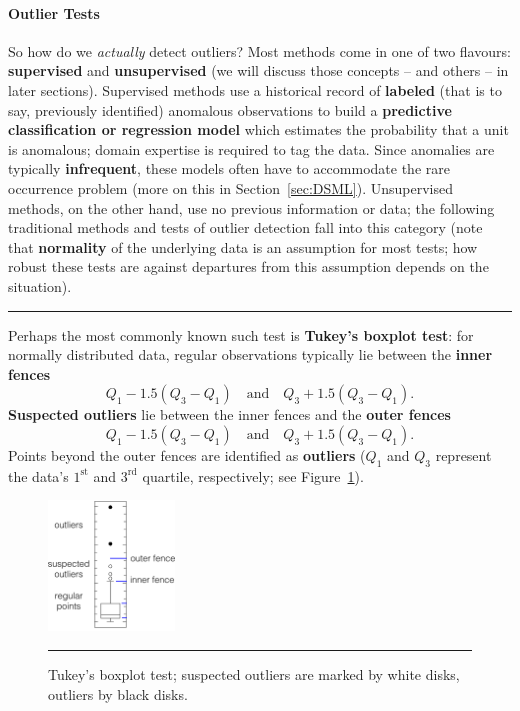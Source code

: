 \paragraph{Outlier Tests} So how do we \textit{actually} detect outliers? Most methods come in one of two flavours: \textbf{supervised} and \textbf{unsupervised} (we will discuss those concepts -- and others -- in later sections).\newl 
Supervised methods use a historical record of \textbf{labeled} (that is to say, previously identified) anomalous observations to build a \textbf{predictive classification or regression model} which estimates the probability that a unit is anomalous; domain expertise is required to tag the data. Since anomalies are typically \textbf{infrequent}, these models often have to accommodate the rare occurrence problem (more on this in Section~\ref{sec:DSML}). Unsupervised methods, on the other hand, use no previous information or data; the following traditional methods and tests of outlier detection fall into this category (note that \textbf{normality} of the underlying data is an assumption for most tests; how robust these tests are against departures from this assumption depends on the situation).
\begin{center}
    \rule{0.5\textwidth}{.4pt}
\end{center}
Perhaps the most commonly known such test is \textbf{Tukey's boxplot test}: for normally distributed data, regular observations typically lie between the \textbf{inner fences} $$Q_1-1.5(Q_3-Q_1) \quad\mbox{and}\quad Q_3+1.5(Q_3-Q_1).$$ \textbf{Suspected outliers} lie between the inner fences and the \textbf{outer fences} 
$$Q_1-1.5(Q_3-Q_1) \quad\mbox{and}\quad Q_3+1.5(Q_3-Q_1).$$
Points beyond the outer fences are identified as \textbf{outliers} ($Q_1$ and $Q_3$ represent the data's   $1^{\textrm{st}}$ and $3^{\textrm{rd}}$ quartile, respectively; see Figure~\ref{fig:boxplot}).
\begin{figure}[t]
\centering
\includegraphics[width=0.30\textwidth]{Images/boxplot.png}
\caption[\small Tukey's boxplot test for outliers]{\small Tukey's boxplot test; suspected outliers are marked by white disks, outliers by black disks.}
\hrule\label{fig:boxplot}
\end{figure}
